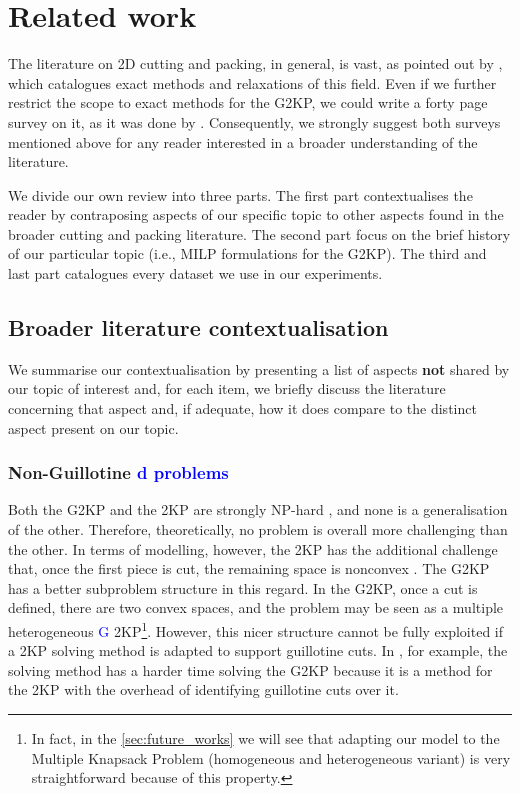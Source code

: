 \documentclass[ppgc,tese,english,formais,babel]{iiufrgs}
\newif\iffinalversion
\newcommand{\newtext}[1]{\iffinalversion%
#1%
\else%
\textcolor{blue}{#1}%
\fi%
}
\begin{document}
\chapter{Related work}
\label{sec:related_work}

The literature on 2D cutting and packing, in general, is vast, as pointed out by \citet{iori:2020}, which catalogues exact methods and relaxations of this field.
Even if we further restrict the scope to exact methods for the G2KP, we could write a forty page survey on it, as it was done by \citet{russo:2020}.
Consequently, we strongly suggest both surveys mentioned above for any reader interested in a broader understanding of the literature.

We divide our own review into three parts. The first part contextualises the reader by contraposing aspects of our specific topic to other aspects found in the broader cutting and packing literature. The second part focus on the brief history of our particular topic (i.e., MILP formulations for the G2KP). The third and last part catalogues every dataset we use in our experiments.

\section{Broader literature contextualisation}

We summarise our contextualisation by presenting a list of aspects \textbf{not} shared by our topic of interest and, for each item, we briefly discuss the literature concerning that aspect and, if adequate, how it does compare to the distinct aspect present on our topic.

\subsection{Non-Guillotine\newtext{d problems}}

Both the G2KP and the 2KP are strongly NP-hard \citep{iori:2020}, and none is a generalisation of the other.
Therefore, theoretically, no problem is overall more challenging than the other.
In terms of modelling, however, the 2KP has the additional challenge that, once the first piece is cut, the remaining space is nonconvex \citep{fekete:1997}.
The G2KP has a better subproblem structure in this regard.
In the G2KP, once a cut is defined, there are two convex spaces, and the problem may be seen as a multiple heterogeneous \newtext{G}2KP\footnote{In fact, in the \cref{sec:future_works} we will see that adapting our model to the Multiple Knapsack Problem (homogeneous and heterogeneous variant) is very straightforward because of this property.}.
However, this nicer structure cannot be fully exploited if a 2KP solving method is adapted to support guillotine cuts.
In \citet{nascimento:2019}, for example, the solving method has a harder time solving the G2KP because it is a method for the 2KP with the overhead of identifying guillotine cuts over it.
\end{document}
